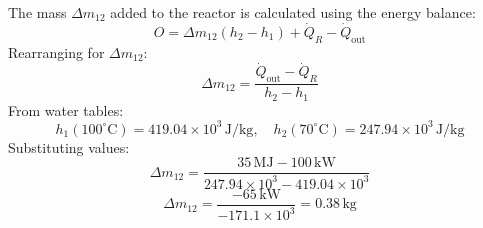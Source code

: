 The mass \( \Delta m_{12} \) added to the reactor is calculated using the energy balance:  
\[
O = \Delta m_{12} \left( h_2 - h_1 \right) + \dot{Q}_R - \dot{Q}_{\text{out}}
\]  
Rearranging for \( \Delta m_{12} \):  
\[
\Delta m_{12} = \frac{\dot{Q}_{\text{out}} - \dot{Q}_R}{h_2 - h_1}
\]  
From water tables:  
\[
h_1(100^\circ\text{C}) = 419.04 \times 10^3 \, \text{J/kg}, \quad h_2(70^\circ\text{C}) = 247.94 \times 10^3 \, \text{J/kg}
\]  
Substituting values:  
\[
\Delta m_{12} = \frac{35 \, \text{MJ} - 100 \, \text{kW}}{247.94 \times 10^3 - 419.04 \times 10^3}
\]  
\[
\Delta m_{12} = \frac{-65 \, \text{kW}}{-171.1 \times 10^3} = 0.38 \, \text{kg}
\]
